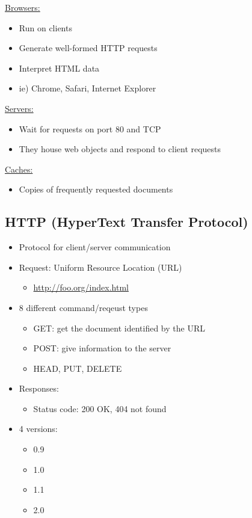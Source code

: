 \documentclass[11pt]{article}
\begin{document}
\uline{Browsers:}
\begin{itemize}
\item Run on clients
\item Generate well-formed HTTP requests
\item Interpret HTML data
\item ie) Chrome, Safari, Internet Explorer
\end{itemize}

\uline{Servers:}
\begin{itemize}
\item Wait for requests on port 80 and TCP
\item They house web objects and respond to client requests
\end{itemize}

\uline{Caches:}
\begin{itemize}
\item Copies of frequently requested documents
\end{itemize}

\subsection{HTTP (HyperText Transfer Protocol)}
\label{sec:orgheadline151}
\begin{itemize}
\item Protocol for client/server communication
\item Request: Uniform Resource Location (URL)
\begin{itemize}
\item \url{http://foo.org/index.html}
\end{itemize}
\item 8 different command/reqeust types
\begin{itemize}
\item GET: get the document identified by the URL
\item POST: give information to the server
\item HEAD, PUT, DELETE
\end{itemize}
\item Responses:
\begin{itemize}
\item Status code: 200 OK, 404 not found
\end{itemize}
\item 4 versions:
\begin{itemize}
\item 0.9
\item 1.0
\item 1.1
\item 2.0
\end{itemize}
\end{itemize}
\end{document}
